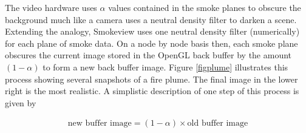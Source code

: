 \documentclass[11pt,twoside]{book}
\begin{document}
The video hardware uses $\alpha$ values contained in the smoke planes to obscure the background much like a camera uses a neutral density filter to darken a scene.  Extending the analogy, Smokeview uses one neutral density filter (numerically) for each plane of smoke data.  On a node by node basis then, each smoke plane obscures the current image stored in the OpenGL back buffer by the amount $(1-\alpha)$ to form a new back buffer image.  Figure \ref{figplume} illustrates this process showing several snapshots of a fire plume. The final image in the lower right is the most realistic.
A simplistic description of one step of this process is given by

\begin{eqnarray*}
\mbox{new buffer image} = (1-\alpha)\times \mbox{old buffer image}
\end{eqnarray*}
\end{document}
